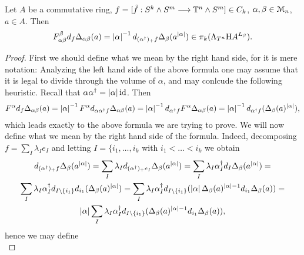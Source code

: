   \begin{cor}\label{cor_fdw_relation_arbitrary_dimensions}
  Let $A$ be a commutative ring, $f = [\tilde{f}: S^k \wedge S^m \longrightarrow \mathbb{T}^n \wedge S^m] \in C_k$, $\alpha,\beta \in \mathcal{M}_n$, $a \in A$. Then
  \begin{equation*}
    F_{\alpha\beta}^\beta d_f \Delta_{\alpha\beta} (a) =%
    \abs{\alpha}^{-1}d_{(\alpha^\dagger)_+ f} \Delta_{\beta}(a^{\abs{\alpha}})%
    \in \pi_k (\Lambda_{T^n} \H A ^{L_\beta}).%
  \end{equation*}
  \begin{proof}
   First we should define what we mean by the right hand side, for it is mere notation: Analyzing the left hand side of the above formula one may assume that it is legal to divide through the volume of $\alpha$, and may conlcude the following heuristic. Recall that $\alpha \alpha^\dagger = \left\vert\alpha\right\vert \operatorname{id}$. Then
  \begin{gather*}
    F^\alpha d_f \Delta_{\alpha\beta} (a) = %
      \abs{\alpha}^{-1} F^\alpha d_{\alpha \alpha^\dagger f}%
        \Delta_{\alpha\beta} (a) = %
      \abs{\alpha}^{-1} d_{\alpha^\dagger f} F^\alpha
        \Delta_{\alpha\beta} (a) = %
      \abs{\alpha}^{-1} d_{\alpha^\dagger f}
        ( \Delta_{\beta} (a)^{\abs{\alpha}} ),%
  \end{gather*}
  which leads exactly to the above formula we are trying to prove. We will now define what we mean by the right hand side of the formula. Indeed, decomposing $f = \sum_I \lambda_I e_I$ and letting $I = \{i_1, \ldots , i_k$ with $i_1 < \ldots < i_k$ we obtain
  \begin{gather*}
    d_{(\alpha^\dagger)_+ f} \Delta_{\beta}(a^{\abs{\alpha}}) = %
    \sum_I \lambda_I d_{(\alpha^\dagger)_+ e_I} \Delta_{\beta}
      (a^{\abs{\alpha}}) = %
    \sum_I \lambda_I \alpha^\dagger_I d_I \Delta_{\beta}(a^{\abs{\alpha}}) = \\%
    \sum_I \lambda_I \alpha^\dagger_I d_{I \setminus \{i_1\}} d_{i_1}
      (\Delta_{\beta}(a)^{\abs{\alpha}}) = %
    \sum_I \lambda_I \alpha^\dagger_I d_{I \setminus \{i_1\}} (
      \abs{\alpha} \Delta_{\beta}(a)^{\abs{\alpha}-1} d_{i_1} \Delta_{\beta}(a) ) = \\%
    \abs{\alpha} \sum_I \lambda_I \alpha^\dagger_I d_{I \setminus \{i_1\}}
      (\Delta_{\beta}(a)^{\abs{\alpha}-1} d_{i_1} \Delta_{\beta}(a)),%
  \end{gather*}
  hence we may define
  \begin{equation*}

\end{equation*}
\end{proof}
\end{cor}
